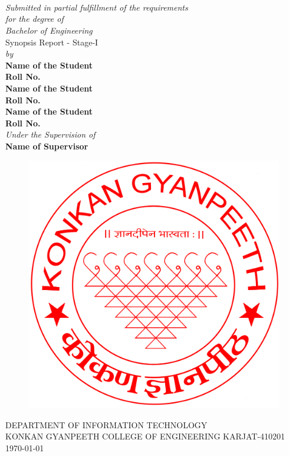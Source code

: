 \documentclass[11pt, a4paper, oneside]{Thesis} %
\begin{document}
\begin{titlepage}
\begin{center}

\HRule \\[0.4cm] %
{\huge \bfseries \ttitle}\\[0.4cm] %
\HRule \\[0.5cm] %
 
\large \textit{Submitted in partial fulfillment of the requirements \\ for the degree of \\ Bachelor of Engineering}\\ %
Synopsis Report - Stage-I \\[0.3cm]
\textit{by}\\[0.4cm]

\textbf{Name of the Student}\\
\textbf{Roll No.}\\
\textbf{Name of the Student}\\
\textbf{Roll No.}\\
\textbf{Name of the Student}\\
\textbf{Roll No.}
\textit{\\Under the Supervision of} \\ 
\textbf{Name of Supervisor}
\vfill
\graphicspath{ {./Figures/} }
\begin{figure}[hb]
  \centering
  \includegraphics[width=0.3\linewidth]{Pictures/kgce_logo.jpg}
\end{figure}

\textsc{DEPARTMENT OF INFORMATION TECHNOLOGY \\ KONKAN GYANPEETH COLLEGE OF ENGINEERING KARJAT-410201}\\ %
\large \today\\[0.4cm] %


\end{center}

\end{titlepage}
\end{document}
